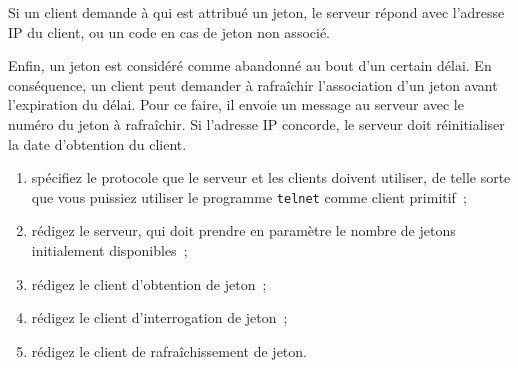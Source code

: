\documentclass [twoside] {report}
\begin{document}
Si un client demande à qui est attribué un jeton, le serveur répond
avec l'adresse IP du client, ou un code en cas de jeton non associé.

Enfin, un jeton est considéré comme abandonné au bout d'un certain
délai. En conséquence, un client peut demander à rafraîchir
l'association d'un jeton avant l'expiration du délai. Pour ce faire,
il envoie un message au serveur avec le numéro du jeton à rafraîchir.
Si l'adresse IP concorde, le serveur doit réinitialiser la date
d'obtention du client.

\begin {enumerate}
    \item spécifiez le protocole que le serveur et les clients doivent
	utiliser, de telle sorte que vous puissiez utiliser le programme
	\texttt {telnet} comme client primitif~;
    \item rédigez le serveur, qui doit prendre en paramètre le
	nombre de jetons initialement disponibles~;
    \item rédigez le client d'obtention de jeton~;
    \item rédigez le client d'interrogation de jeton~;
    \item rédigez le client de rafraîchissement de jeton.
\end {enumerate}
\end{document}
